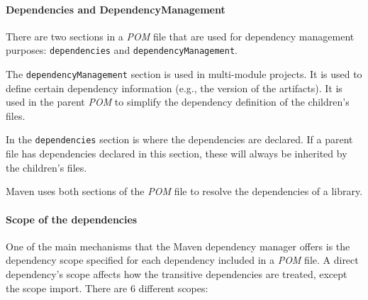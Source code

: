\paragraph{Dependencies and DependencyManagement}
There are two sections in a \textit{POM} file that are used for dependency management purposes: \texttt{dependencies} and \texttt{dependencyManagement}.

The \texttt{dependencyManagement} section is used in multi-module projects. It is used to define certain dependency information (e.g., the version of the artifacts). It is used in the parent \textit{POM} to simplify the dependency definition of the children's files.

In the \texttt{dependencies} section is where the dependencies are declared. If a parent file has dependencies declared in this section, these will always be inherited by the children's files.

Maven uses both sections of the \textit{POM} file to resolve the dependencies of a library.

\paragraph{Scope of the dependencies}
One of the main mechanisms that the Maven dependency manager offers is the dependency scope specified for each dependency included in a \textit{POM} file. A direct dependency's scope affects how the transitive dependencies are treated, except the scope import. There are 6 different scopes:

